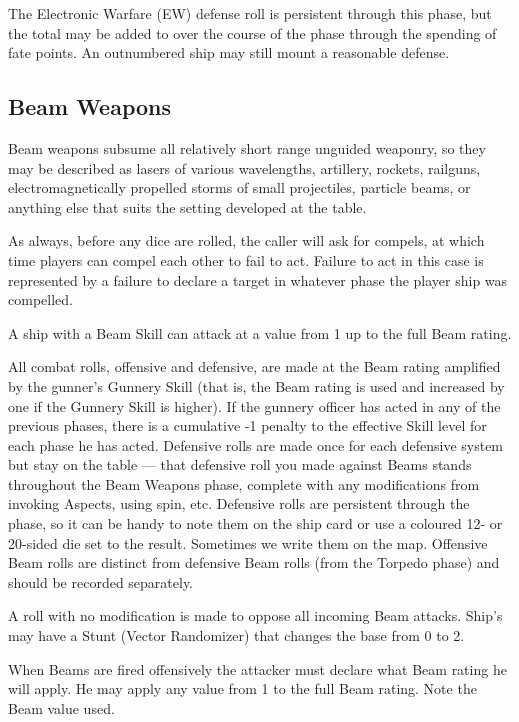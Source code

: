 The Electronic Warfare (EW) defense roll is persistent through this phase, but the total may be added to over the course of the phase through the spending of fate points. An outnumbered ship may still mount a reasonable defense.


\subsection{Beam Weapons}\label{sec:Beam Weapons} %

Beam weapons subsume all relatively short range unguided weaponry, so they may be described as lasers of various wavelengths, artillery, rockets, railguns, electromagnetically propelled storms of small projectiles, particle beams, or anything else that suits the setting developed at the table.

As always, before any dice are rolled, the caller will ask for compels, at which time players can compel each other to fail to act. Failure to act in this case is represented by a failure to declare a target in whatever phase the player ship was compelled.

A ship with a Beam Skill can attack at a value from 1 up to the full Beam rating.

All combat rolls, offensive and defensive, are made at the Beam rating amplified by the gunner's Gunnery Skill (that is, the Beam rating is used and increased by one if the Gunnery Skill is higher). If the gunnery officer has acted in any of the previous phases, there is a cumulative -1 penalty to the effective Skill level for each phase he has acted. Defensive rolls are made once for each defensive system but stay on the table --- that defensive roll you made against Beams stands throughout the Beam Weapons phase, complete with any modifications from invoking Aspects, using spin, etc. Defensive rolls are persistent through the phase, so it can be handy to note them on the ship card or use a coloured 12- or 20-sided die set to the result. Sometimes we write them on the map. Offensive Beam rolls are distinct from defensive Beam rolls (from the Torpedo phase) and should be recorded separately.

A roll with no modification is made to oppose all incoming Beam attacks. Ship's may have a Stunt (Vector Randomizer) that changes the base from 0 to 2.


When Beams are fired offensively the attacker must declare what Beam rating he will apply. He may apply any value from 1 to the full Beam rating. Note the Beam value used.

